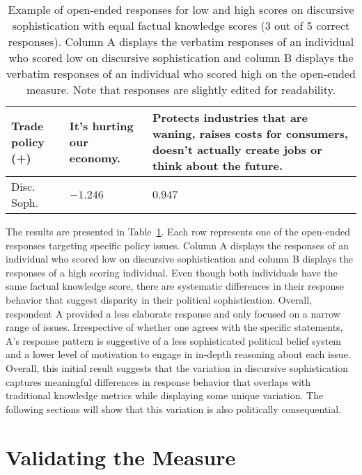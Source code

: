 \begin{table}[ht]
\begin{tabular}{l|p{5.0cm}|p{7.6cm}}
					\\\hdashline
Trade policy (+)	& It's hurting our economy.
					& Protects industries that are waning, raises costs for consumers, doesn't actually create jobs or think about the future.
					\\\midrule
Disc. Soph. 		& $-1.246$
					& $0.947$
					\\\bottomrule
\end{tabular}
\caption[Example of open-ended responses for low and high scores on discursive sophistication]{Example of open-ended responses for low and high scores on discursive sophistication with equal factual knowledge scores (3 out of 5 correct responses). Column A displays the verbatim responses of an individual who scored low on discursive sophistication and column B displays the verbatim responses of an individual who scored high on the open-ended measure. Note that responses are slightly edited for readability.}\label{tab:ex1}
\end{table}

The results are presented in Table~\ref{tab:ex1}. Each row represents one of the open-ended responses targeting specific policy issues. Column A displays the responses of an individual who scored low on discursive sophistication and column B displays the responses of a high scoring individual. Even though both individuals have the same factual knowledge score, there are systematic differences in their response behavior that suggest disparity in their political sophistication. Overall, respondent A provided a less elaborate response and only focused on a narrow range of issues. Irrespective of whether one agrees with the specific statements, A's response pattern is suggestive of a less sophisticated political belief system and a lower level of motivation to engage in in-depth reasoning about each issue. Overall, this initial result suggests that the variation in discursive sophistication captures meaningful differences in response behavior that overlaps with traditional knowledge metrics while displaying some unique variation. The following sections will show that this variation is also politically consequential.




\section*{Validating the Measure}

